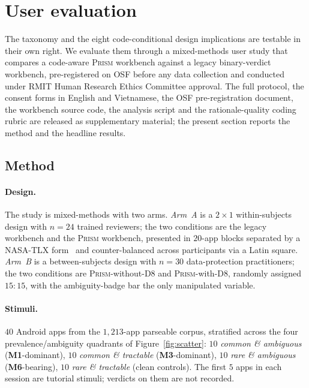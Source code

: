 \documentclass[11pt,a4paper]{article}
\newcommand{\prism}{\textsc{Prism}}
\newcommand{\code}[1]{\textsf{\textbf{#1}}}
\begin{document}
\section{User evaluation}\label{sec:userstudy-results}

\noindent
The taxonomy and the eight code-conditional design implications are
testable in their own right. We evaluate them through a
mixed-methods user study that compares a code-aware \prism{}
workbench against a legacy binary-verdict workbench, pre-registered
on OSF before any data collection
\citep{simmons2021pre} and conducted under RMIT Human Research
Ethics Committee approval. The full protocol, the consent forms in
English and Vietnamese, the OSF pre-registration document, the
workbench source code, the analysis script and the
rationale-quality coding rubric are released as supplementary
material; the present section reports the method and the headline
results.

\subsection{Method}\label{sec:user-method}

\paragraph{Design.}
The study is mixed-methods with two arms. \emph{Arm~A} is a
$2\!\times\!1$ within-subjects design with $n\!=\!24$ trained
reviewers; the two conditions are the legacy workbench and the
\prism{} workbench, presented in $20$-app blocks separated by a
NASA-TLX form~\citep{hart2008measurement} and counter-balanced
across participants via a Latin square. \emph{Arm~B} is a
between-subjects design with $n\!=\!30$ data-protection
practitioners; the two conditions are \prism{}-without-D8 and
\prism{}-with-D8, randomly assigned $15{:}15$, with the
ambiguity-badge bar the only manipulated variable.

\paragraph{Stimuli.}
$40$ Android apps from the $1{,}213$-app parseable corpus,
stratified across the four prevalence/ambiguity quadrants of
Figure~\ref{fig:scatter}: $10$ \emph{common \& ambiguous}
(\code{M1}-dominant), $10$ \emph{common \& tractable}
(\code{M3}-dominant), $10$ \emph{rare \& ambiguous}
(\code{M6}-bearing), $10$ \emph{rare \& tractable}
(clean controls). The first $5$ apps in each session are
tutorial stimuli; verdicts on them are not recorded.
\end{document}

